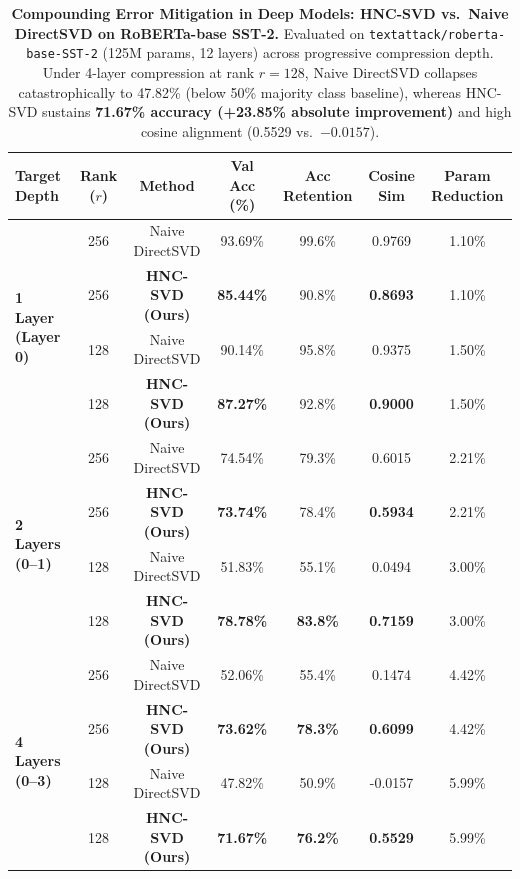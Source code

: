 \begin{table}[t]
\centering
\caption{\textbf{Compounding Error Mitigation in Deep Models: HNC-SVD vs.\ Naive DirectSVD on RoBERTa-base SST-2.}
Evaluated on \texttt{textattack/roberta-base-SST-2} (125M params, 12 layers) across progressive compression depth.
Under 4-layer compression at rank $r=128$, Naive DirectSVD collapses catastrophically to 47.82\% (below 50\% majority class baseline), whereas HNC-SVD sustains \textbf{71.67\% accuracy (+23.85\% absolute improvement)} and high cosine alignment (0.5529 vs.\ $-0.0157$).}
\label{tab:roberta_hnc}
\small
\setlength{\tabcolsep}{4pt}
\begin{tabular}{lcccccc}
\toprule
\textbf{Target Depth} & \textbf{Rank ($r$)} & \textbf{Method} & \textbf{Val Acc (\%)} & \textbf{Acc Retention} & \textbf{Cosine Sim} & \textbf{Param Reduction} \\
\midrule
\multirow{4}{*}{\textbf{1 Layer (Layer 0)}} & 256 & Naive DirectSVD & 93.69\% & 99.6\% & 0.9769 & 1.10\% \\
 & 256 & \textbf{HNC-SVD (Ours)} & \textbf{85.44\%} & 90.8\% & \textbf{0.8693} & 1.10\% \\
 & 128 & Naive DirectSVD & 90.14\% & 95.8\% & 0.9375 & 1.50\% \\
 & 128 & \textbf{HNC-SVD (Ours)} & \textbf{87.27\%} & 92.8\% & \textbf{0.9000} & 1.50\% \\
\midrule
\multirow{4}{*}{\textbf{2 Layers (0--1)}} & 256 & Naive DirectSVD & 74.54\% & 79.3\% & 0.6015 & 2.21\% \\
 & 256 & \textbf{HNC-SVD (Ours)} & \textbf{73.74\%} & 78.4\% & \textbf{0.5934} & 2.21\% \\
 & 128 & Naive DirectSVD & 51.83\% & 55.1\% & 0.0494 & 3.00\% \\
 & 128 & \textbf{HNC-SVD (Ours)} & \textbf{78.78\%} & \textbf{83.8\%} & \textbf{0.7159} & 3.00\% \\
\midrule
\multirow{4}{*}{\textbf{4 Layers (0--3)}} & 256 & Naive DirectSVD & 52.06\% & 55.4\% & 0.1474 & 4.42\% \\
 & 256 & \textbf{HNC-SVD (Ours)} & \textbf{73.62\%} & \textbf{78.3\%} & \textbf{0.6099} & 4.42\% \\
 & 128 & Naive DirectSVD & 47.82\% & 50.9\% & -0.0157 & 5.99\% \\
 & 128 & \textbf{HNC-SVD (Ours)} & \textbf{71.67\%} & \textbf{76.2\%} & \textbf{0.5529} & 5.99\% \\
\bottomrule
\end{tabular}
\end{table}
